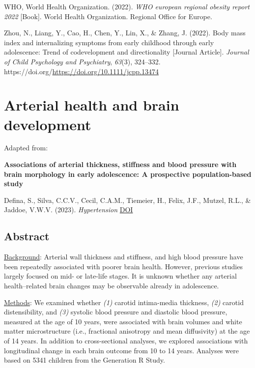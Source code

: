 \documentclass[
  letterpaper,
  DIV=11,
  numbers=noendperiod]{scrreport}
\newlength{\cslhangindent}
\newenvironment{CSLReferences}[2] %
 {\begin{list}{}{%
  \setlength{\itemindent}{0pt}
  \setlength{\leftmargin}{0pt}
  \setlength{\parsep}{0pt}
  \ifodd #1
   \setlength{\leftmargin}{\cslhangindent}
   \setlength{\itemindent}{-1\cslhangindent}
  \fi
  \setlength{\itemsep}{#2\baselineskip}}}
 {\end{list}}
\begin{document}
\begin{CSLReferences}{1}{0}
WHO, World Health Organization. (2022). \emph{WHO european regional
obesity report 2022} {[}Book{]}. World Health Organization. Regional
Office for Europe.

Zhou, N., Liang, Y., Cao, H., Chen, Y., Lin, X., \& Zhang, J. (2022).
Body mass index and internalizing symptoms from early childhood through
early adolescence: Trend of codevelopment and directionality {[}Journal
Article{]}. \emph{Journal of Child Psychology and Psychiatry},
\emph{63}(3), 324--332.
https://doi.org/\url{https://doi.org/10.1111/jcpp.13474}

\end{CSLReferences}

\chapter{Arterial health and brain development}\label{sec-chapter7}

Adapted from:

\textbf{Associations of arterial thickness, stiffness and blood pressure
with brain morphology in early adolescence: A prospective
population-based study}

Defina, S., Silva, C.C.V., Cecil, C.A.M., Tiemeier, H., Felix, J.F.,
Mutzel, R.L., \& Jaddoe, V.W.V. (2023). \emph{Hypertension}
\href{https://doi.org/10.1161/HYPERTENSIONAHA.123.21672}{DOI}

\section*{Abstract}\label{abstract-5}


\ul{Background}: Arterial wall thickness and stiffness, and high blood
pressure have been repeatedly associated with poorer brain health.
However, previous studies largely focused on mid- or late-life stages.
It is unknown whether any arterial health--related brain changes may be
observable already in adolescence.

\ul{Methods}: We examined whether \emph{(1)} carotid intima-media
thickness, \emph{(2)} carotid distensibility, and \emph{(3)} systolic
blood pressure and diastolic blood pressure, measured at the age of 10
years, were associated with brain volumes and white matter
microstructure (i.e., fractional anisotropy and mean diffusivity) at the
age of 14 years. In addition to cross-sectional analyses, we explored
associations with longitudinal change in each brain outcome from 10 to
14 years. Analyses were based on 5341 children from the Generation R
Study.
\end{document}
